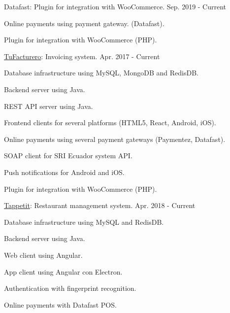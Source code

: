 \begin{cventries}
  \cventry
    {Datafast: Plugin for integration with WooCommerce.} %
    {} %
    {} %
    {Sep. 2019 - Current} %
    {
      \begin{cvitems} %
        \item {Online payments using payment gateway. (Datafast).}
        \item {Plugin for integration with WooCommerce (PHP).}
      \end{cvitems}
    }

  \cventry
    {\href{https://tufacturero.ec}{TuFacturero}: Invoicing system.} %
    {} %
    {} %
    {Apr. 2017 - Current} %
    {
      \begin{cvitems} %
        \item {Database infrastructure using MySQL, MongoDB and RedisDB.}
        \item {Backend server using Java.}
        \item {REST API server using Java.}
        \item {Frontend clients for several platforms (HTML5, React, Android, iOS).}
        \item {Online payments using several payment gateways (Paymentez, Datafast).}
        \item {SOAP client for SRI Ecuador system API.}
        \item {Push notifications for Android and iOS.}
        \item {Plugin for integration with WooCommerce (PHP).}
      \end{cvitems}
    }

  \cventry
    {\href{https://tappetit.com}{Tappetit}: Restaurant management system.} %
    {} %
    {} %
    {Apr. 2018 - Current} %
    {
      \begin{cvitems} %
        \item {Database infrastructure using MySQL and RedisDB.}
        \item {Backend server using Java.}
        \item {Web client using Angular.}
        \item {App client using Angular con Electron.}
        \item {Authentication with fingerprint recognition.}
        \item {Online payments with Datafast POS.}
      \end{cvitems}
    }


\end{cventries}
